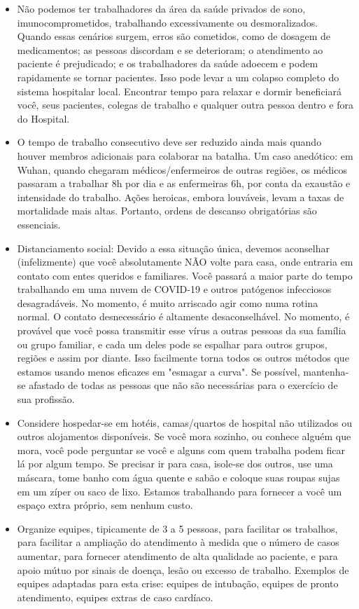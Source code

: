 \documentclass[onecolumn,journal]{IEEEtran}
\begin{document}
\begin{multicols}{2}
\begin{itemize}
    \item Não podemos ter trabalhadores da área da saúde privados de sono, imunocomprometidos, trabalhando excessivamente ou desmoralizados. Quando essas cenários surgem, erros são cometidos, como de dosagem de medicamentos; as pessoas discordam e se deterioram; o atendimento ao paciente é prejudicado; e os trabalhadores da saúde adoecem e podem rapidamente se tornar pacientes. Isso pode levar a um colapso completo do sistema hospitalar local. Encontrar tempo para relaxar e dormir beneficiará você, seus pacientes, colegas de trabalho e qualquer outra pessoa dentro e fora do Hospital.
    \item O tempo de trabalho consecutivo deve ser reduzido ainda mais quando houver membros adicionais para colaborar na batalha. Um caso anedótico: em Wuhan, quando chegaram médicos/enfermeiros de outras regiões, os médicos passaram a trabalhar 8h por dia e as enfermeiras 6h, por conta da exaustão e intensidade do trabalho. Ações heroicas, embora louváveis, levam a taxas de mortalidade mais altas. Portanto, ordens de descanso obrigatórias são essenciais.
    \item Distanciamento social: Devido a essa situação única, devemos aconselhar (infelizmente) que você absolutamente NÃO volte para casa, onde entraria em contato com entes queridos e familiares. Você passará a maior parte do tempo trabalhando em uma nuvem de COVID-19 e outros patógenos infecciosos desagradáveis. No momento, é muito arriscado agir como numa rotina normal. O contato desnecessário é altamente desaconselhável. No momento, é provável que você possa transmitir esse vírus a outras pessoas da sua família ou grupo familiar, e cada um deles pode se espalhar para outros grupos, regiões e assim por diante. Isso facilmente torna todos os outros métodos que estamos usando menos eficazes em "esmagar a curva". Se possível, mantenha-se afastado de todas as pessoas que não são necessárias para o exercício de sua profissão.
    \item Considere hospedar-se em hotéis, camas/quartos de hospital não utilizados ou outros alojamentos disponíveis. Se você mora sozinho, ou conhece alguém que mora, você pode perguntar se você e alguns com quem trabalha podem ficar lá por algum tempo. Se precisar ir para casa, isole-se dos outros, use uma máscara, tome banho com água quente e sabão e coloque suas roupas sujas em um zíper ou saco de lixo. Estamos trabalhando para fornecer a você um espaço extra próprio, sem nenhum custo.
    \item Organize equipes, tipicamente de 3 a 5 pessoas, para facilitar os trabalhos, para facilitar a ampliação do atendimento à medida que o número de casos aumentar, para fornecer atendimento de alta qualidade ao paciente, e para apoio mútuo por sinais de doença, lesão ou excesso de trabalho. Exemplos de equipes adaptadas para esta crise: equipes de intubação, equipes de pronto atendimento, equipes extras de caso cardíaco.

\end{itemize}
\end{multicols}
\end{document}
